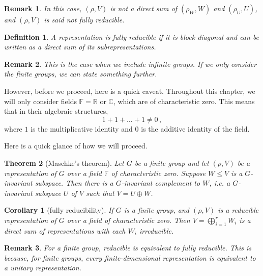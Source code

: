 \documentclass{article}
\theoremstyle{plain}\theoremheaderfont{\normalfont\itshape}\theorembodyfont{\rmfamily}\theoremseparator{.}\newtheorem*{rem}{Remark}\newtheorem*{ex}{Example}\newtheorem*{proof}{Proof}\newtheorem*{altp}{Alternative proof}
\theoremstyle{plain}\theoremheaderfont{\normalfont\bfseries}\theorembodyfont{\rmfamily}\theoremseparator{.}\newtheorem{thm}{Theorem}[section]\newtheorem{lem}[thm]{Lemma}\newtheorem{prop}[thm]{Proposition}\newtheorem*{cor}{Corollary}\newtheorem{defn}[thm]{Definition}\newtheorem{clm}[thm]{Claim}\newtheorem{clminproof}{Claim}
\theoremstyle{break}\theoremheaderfont{\normalfont\itshape}\theorembodyfont{\rmfamily}\theoremseparator{.\medskip}\newtheorem*{proofskip}{Proof}\newtheorem*{exs}{Examples}\newtheorem*{rems}{Remarks}
\theoremstyle{break}\theoremheaderfont{\normalfont\bfseries}\theorembodyfont{\rmfamily}\theoremseparator{.\medskip}\newtheorem{lemskip}[thm]{Lemma}\newtheorem{defnskip}[thm]{Definition}\newtheorem{propskip}[thm]{Proposition}\newtheorem{thmskip}[thm]{Theorem}
\numberwithin{equation}{section}
\begin{document}
	\begin{rem}
		In this case, \((\rho,V)\) is not a direct sum of \((\rho_W,W)\) and \((\rho_U,U)\), and \((\rho,V)\) is said \textit{not fully reducible}.
	\end{rem}
	\begin{defn}
		A representation is \textit{fully reducible} if it is block diagonal and can be written as a direct sum of its subrepresentations.
	\end{defn}
	\begin{rem}
		This is the case when we include infinite groups. If we only consider the finite groups, we can state something further.
	\end{rem}
	However, before we proceed, here is a quick caveat. Throughout this chapter, we will only consider fields \(\mathbb{F}=\mathbb{R}\) or \(\mathbb{C}\), which are of characteristic zero. This means that in their algebraic structures,
	\[1+1+\dots+1\ne 0\,,\]
	where \(1\) is the multiplicative identity and \(0\) is the additive identity of the field.

	Here is a quick glance of how we will proceed.
	\begin{thm}[Maschke's theorem]
		Let \(G\) be a finite group and let \((\rho,V)\) be a representation of \(G\) over a field \(\mathbb{F}\) of characteristic zero. Suppose \(W\le V\) is a \(G\)-invariant subspace. Then there is a \(G\)-invariant complement to \(W\), i.e. a \(G\)-invariant subspace \(U\) of \(V\) such that \(V=U\oplus W\).
	\end{thm}
	\begin{cor}[fully reducibility]
		If \(G\) is a finite group, and \((\rho, V)\) is a reducible representation of \(G\) over a field of characteristic zero. Then \(V=\bigoplus_{i=1}^{r}W_i\) is a direct sum of representations with each \(W_i\) irreducible.
	\end{cor}
	\begin{rem}
		For a finite group, reducible is equivalent to fully reducible. This is because, for finite groups, every finite-dimensional representation is equivalent to a unitary representation.
	\end{rem}
\end{document}
